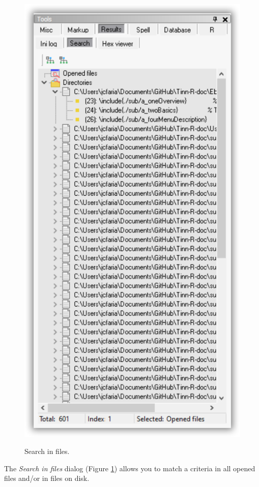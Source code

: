 \begin{figure}[H]
  \includegraphics[scale=0.35]{./res/tools_results_search.png}\\
  \caption{Search in files.}
  \label{fig:searchinfiles}
\end{figure}


The \textit{Search in files} dialog
(Figure \ref{fig:searchinfiles})
allows you to match a criteria in all opened files and/or in files on disk.



